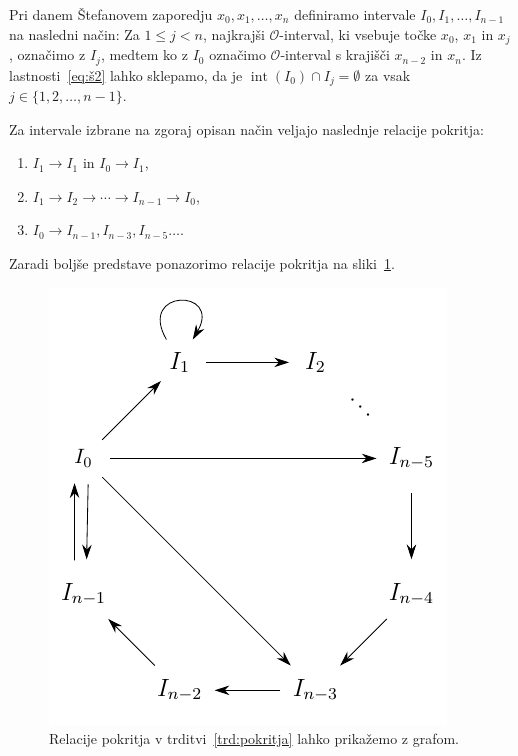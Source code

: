 \documentclass[mat2]{fmfdelo}
\DeclareMathOperator{\interior}{int}
\begin{document}
Pri danem Štefanovem zaporedju $x_0, x_1, \dots, x_n$ definiramo intervale $I_0, I_1, \dots, I_{n-1}$ na  nasledni način: Za $1 \leq j < n$, najkrajši $\mathcal{O}$-interval, ki vsebuje točke $x_0$, $x_1$ in $x_j$, označimo z $I_j$, medtem ko z $I_0$ označimo $\mathcal{O}$-interval s krajišči $x_{n-2}$ in $x_n$. Iz lastnosti~\ref{eq:š2} lahko sklepamo, da je $\interior(I_0) \cap I_j = \emptyset$ za vsak $j \in \{1, 2, \dots, n-1\}$.

\begin{trditev}\label{trd:pokritja}
Za intervale izbrane na zgoraj opisan način veljajo naslednje relacije pokritja:
\begin{enumerate}
\item $I_1 \to I_1$ in $I_0 \to I_1$,\label{trd:pokritja1}
\item $I_1 \to I_2 \to \cdots \to I_{n-1} \to I_0$,\label{trd:pokritja2}
\item $I_0 \to I_{n-1}, I_{n-3}, I_{n-5} \dots $.\label{trd:pokritja3}
\end{enumerate}
Zaradi boljše predstave ponazorimo relacije pokritja na sliki~\ref{fig:nkotnik}.
\end{trditev}

\begin{figure}[h]
  \centering
  \includegraphics{images/graph_n.pdf}
  \caption[Primer vektorske slike.]{Relacije pokritja v trditvi~\ref{trd:pokritja} lahko prikažemo z grafom.}
  \label{fig:nkotnik}
\end{figure}
\end{document}
